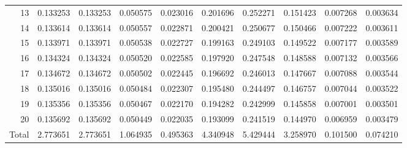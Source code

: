 \documentclass[lettersize,journal]{IEEEtran}
\begin{document}
\begin{table}[ht!]
\begin{center}
\begin{tabular}{r|l|l|l|l|l|l|l|l|l}
      13 & 0.133253 & 0.133253 & 0.050575 & 0.023016 & 0.201696 & 0.252271 & 0.151423 & 0.007268 & 0.003634 \\
      14 & 0.133614 & 0.133614 & 0.050557 & 0.022871 & 0.200421 & 0.250677 & 0.150466 & 0.007222 & 0.003611 \\
      15 & 0.133971 & 0.133971 & 0.050538 & 0.022727 & 0.199163 & 0.249103 & 0.149522 & 0.007177 & 0.003589 \\
      16 & 0.134324 & 0.134324 & 0.050520 & 0.022585 & 0.197920 & 0.247548 & 0.148588 & 0.007132 & 0.003566 \\
      17 & 0.134672 & 0.134672 & 0.050502 & 0.022445 & 0.196692 & 0.246013 & 0.147667 & 0.007088 & 0.003544 \\
      18 & 0.135016 & 0.135016 & 0.050484 & 0.022307 & 0.195480 & 0.244497 & 0.146757 & 0.007044 & 0.003522 \\
      19 & 0.135356 & 0.135356 & 0.050467 & 0.022170 & 0.194282 & 0.242999 & 0.145858 & 0.007001 & 0.003501 \\
      20 & 0.135692 & 0.135692 & 0.050449 & 0.022035 & 0.193099 & 0.241519 & 0.144970 & 0.006959 & 0.003479 \\
      Total & 2.773651 & 2.773651 & 1.064935 & 0.495363 & 4.340948 & 5.429444 & 3.258970 & 0.101500 & 0.074210 \\
    \end{tabular}
  \end{center}
\end{table}
\end{document}
